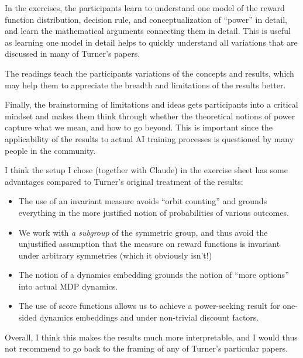 \documentclass[11pt]{article}
\begin{document}
\begin{teachingnote}
In the exercises, the participants learn to understand one model of the reward
function distribution, decision rule, and conceptualization of ``power'' in
detail, and learn the mathematical arguments connecting them in detail. This is
useful as learning one model in detail helps to quickly understand all variations
that are discussed in many of Turner's papers.

The readings teach the participants variations of the concepts and results, which
may help them to appreciate the breadth and limitations of the results better.

Finally, the brainstorming of limitations and ideas gets participants into a
critical mindset and makes them think through whether the theoretical notions of
power capture what we mean, and how to go beyond. This is important since the
applicability of the results to actual AI training processes is questioned by
many people in the community.
\end{teachingnote}

\begin{teachingnote}
I think the setup I chose (together with Claude) in the exercise sheet has some
advantages compared to Turner's original treatment of the results:

\begin{itemize}
  \item The use of an invariant measure avoids ``orbit counting'' and grounds everything in the more justified notion of probabilities of various outcomes.
  \item We work with \emph{a subgroup} of the symmetric group, and thus avoid the unjustified assumption that the measure on reward functions is invariant under arbitrary symmetries (which it obviously isn't!)
  \item The notion of a dynamics embedding grounds the notion of ``more options'' into actual MDP dynamics.
  \item The use of score functions allows us to achieve a power-seeking result for one-sided dynamics embeddings and under non-trivial discount factors.
\end{itemize}

Overall, I think this makes the results much more interpretable, and I would thus
not recommend to go back to the framing of any of Turner's particular papers.
\end{teachingnote}
\end{document}
